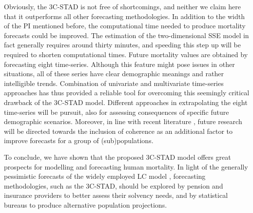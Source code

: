 \documentclass[Thesis]{subfiles}
\begin{document}
Obviously, the 3C-STAD is not free of shortcomings, and neither we claim here that it outperforms all other forecasting methodologies. In addition to the width of the PI mentioned before, the computational time needed to produce mortality forecasts could be improved. The estimation of the two-dimensional SSE model in fact generally requires around thirty minutes, and speeding this step up will be required to shorten computational times. Future mortality values are obtained by forecasting eight time-series. Although this feature might pose issues in other situations, all of these series have clear demographic meanings and rather intelligible trends. Combination of univariate and multivariate time-series approaches has thus provided a reliable tool for overcoming this seemingly critical drawback of the 3C-STAD model. Different approaches in extrapolating the eight time-series will be pursuit, also for assessing consequences of specific future demographic scenarios. Moreover, in line with recent literature \citep{li2005coherent,hyndman2013coherent,janssen2013smoking,bergeron2017coherent}, future research will be directed towards the inclusion of coherence as an additional factor to improve forecasts for a group of (sub)populations.    

To conclude, we have shown that the proposed 3C-STAD model offers great prospects for modelling and forecasting human mortality. In light of the generally pessimistic forecasts of the widely employed LC model \citep{li2013extending,seligman2016convergence}, forecasting methodologies, such as the 3C-STAD, should be explored by pension and insurance providers to better assess their solvency needs, and by statistical bureaus to produce alternative population projections. 

\cleardoublepage
\end{document}
